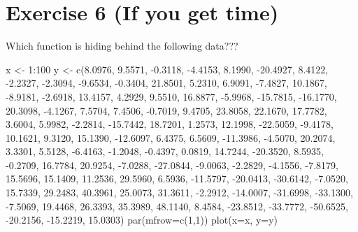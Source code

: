 \documentclass[10pt,a4paper,english]{report}
\begin{document}
\section*{Exercise 6 (If you get time)}
Which function is hiding behind the following data??? 
\begin{Schunk}
\begin{Sinput}
x <- 1:100
y <- c(8.0976, 9.5571, -0.3118, -4.4153, 8.1990, -20.4927, 8.4122, -2.2327, 
   -2.3094, -9.6534, -0.3404, 21.8501, 5.2310, 6.9091, -7.4827, 10.1867, -8.9181, 
   -2.6918, 13.4157, 4.2929, 9.5510, 16.8877, -5.9968, -15.7815, -16.1770, 
   20.3098, -4.1267, 7.5704, 7.4506, -0.7019, 9.4705, 23.8058, 22.1670, 17.7782, 
   3.6004, 5.9982, -2.2814, -15.7442, 18.7201, 1.2573, 12.1998, -22.5059,
   -9.4178, 10.1621, 9.3120, 15.1390, -12.6097, 6.4375, 6.5609, -11.3986, 
   -4.5070, 20.2074, 3.3301, 5.5128, -6.4163, -1.2048, -0.4397, 0.0819, 14.7244, 
   -20.3520, 8.5935, -0.2709, 16.7784, 20.9254, -7.0288, -27.0844, -9.0063, 
   -2.2829, -4.1556, -7.8179, 15.5696, 15.1409, 11.2536, 29.5960, 6.5936, 
   -11.5797, -20.0413, -30.6142, -7.0520, 15.7339, 29.2483, 40.3961, 25.0073, 
   31.3611, -2.2912, -14.0007, -31.6998, -33.1300, -7.5069, 19.4468, 26.3393, 
   35.3989, 48.1140, 8.4584, -23.8512, -33.7772, -50.6525, -20.2156, -15.2219, 
   15.0303)
par(mfrow=c(1,1))
plot(x=x, y=y)
\end{Sinput}
\end{Schunk}
\end{document}
